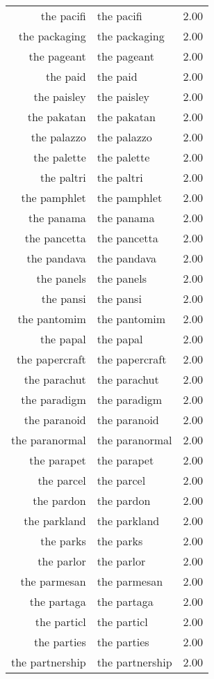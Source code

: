 \begin{table}[ht]
\begin{tabular}{rlr}
  the pacifi & the pacifi & 2.00 \\ 
  the packaging & the packaging & 2.00 \\ 
  the pageant & the pageant & 2.00 \\ 
  the paid & the paid & 2.00 \\ 
  the paisley & the paisley & 2.00 \\ 
  the pakatan & the pakatan & 2.00 \\ 
  the palazzo & the palazzo & 2.00 \\ 
  the palette & the palette & 2.00 \\ 
  the paltri & the paltri & 2.00 \\ 
  the pamphlet & the pamphlet & 2.00 \\ 
  the panama & the panama & 2.00 \\ 
  the pancetta & the pancetta & 2.00 \\ 
  the pandava & the pandava & 2.00 \\ 
  the panels & the panels & 2.00 \\ 
  the pansi & the pansi & 2.00 \\ 
  the pantomim & the pantomim & 2.00 \\ 
  the papal & the papal & 2.00 \\ 
  the papercraft & the papercraft & 2.00 \\ 
  the parachut & the parachut & 2.00 \\ 
  the paradigm & the paradigm & 2.00 \\ 
  the paranoid & the paranoid & 2.00 \\ 
  the paranormal & the paranormal & 2.00 \\ 
  the parapet & the parapet & 2.00 \\ 
  the parcel & the parcel & 2.00 \\ 
  the pardon & the pardon & 2.00 \\ 
  the parkland & the parkland & 2.00 \\ 
  the parks & the parks & 2.00 \\ 
  the parlor & the parlor & 2.00 \\ 
  the parmesan & the parmesan & 2.00 \\ 
  the partaga & the partaga & 2.00 \\ 
  the particl & the particl & 2.00 \\ 
  the parties & the parties & 2.00 \\ 
  the partnership & the partnership & 2.00 \\ 

\end{tabular}
\end{table}
